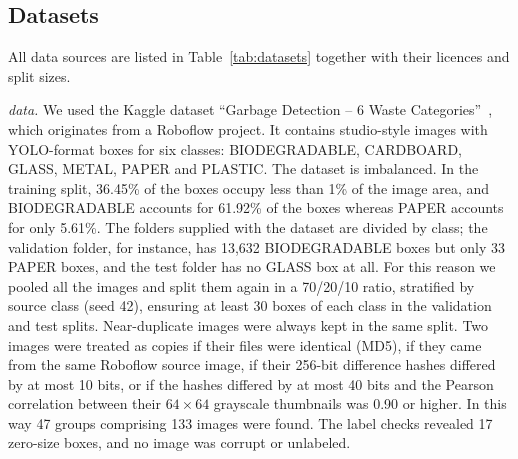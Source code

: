 \subsection{Datasets}
\label{subsec:datasets}

All data sources are listed in Table~\ref{tab:datasets} together with their licences and split sizes.

\textit{\genone data.} We used the Kaggle dataset ``Garbage Detection -- 6 Waste Categories''~\cite{viswaprakash2024garbage}, which originates from a Roboflow project. It contains studio-style images with YOLO-format boxes for six classes: BIODEGRADABLE, CARDBOARD, GLASS, METAL, PAPER and PLASTIC. The dataset is imbalanced. In the training split, 36.45\% of the boxes occupy less than 1\% of the image area, and BIODEGRADABLE accounts for 61.92\% of the boxes whereas PAPER accounts for only 5.61\%. The folders supplied with the dataset are divided by class; the validation folder, for instance, has 13,632 BIODEGRADABLE boxes but only 33 PAPER boxes, and the test folder has no GLASS box at all. For this reason we pooled all the images and split them again in a 70/20/10 ratio, stratified by source class (seed 42), ensuring at least 30 boxes of each class in the validation and test splits. Near-duplicate images were always kept in the same split. Two images were treated as copies if their files were identical (MD5), if they came from the same Roboflow source image, if their 256-bit difference hashes differed by at most 10 bits, or if the hashes differed by at most 40 bits and the Pearson correlation between their $64\times64$ grayscale thumbnails was 0.90 or higher. In this way 47 groups comprising 133 images were found. The label checks revealed 17 zero-size boxes, and no image was corrupt or unlabeled.

